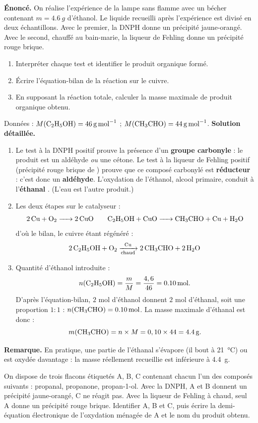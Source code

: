 \documentclass[11pt]{article}
\begin{document}
\begin{exoresolu}
\textbf{Énoncé.} On réalise l'expérience de la lampe sans flamme avec un bécher contenant $m = \SI{4,6}{g}$ d'éthanol. Le liquide recueilli après l'expérience est divisé en deux échantillons. Avec le premier, la DNPH donne un précipité jaune-orangé. Avec le second, chauffé au bain-marie, la liqueur de Fehling donne un précipité rouge brique.
\begin{enumerate}
\item Interpréter chaque test et identifier le produit organique formé.
\item Écrire l'équation-bilan de la réaction sur le cuivre.
\item En supposant la réaction totale, calculer la masse maximale de produit organique obtenu.
\end{enumerate}
Données : $M(\ce{C2H5OH}) = \SI{46}{g.mol^{-1}}$ ; $M(\ce{CH3CHO}) = \SI{44}{g.mol^{-1}}$.
\tcblower
\textbf{Solution détaillée.}
\begin{enumerate}
\item Le test à la DNPH positif prouve la présence d'un \textbf{groupe carbonyle}  : le produit est un aldéhyde \emph{ou} une cétone. Le test à la liqueur de Fehling positif (précipité rouge brique de ) prouve que ce composé carbonylé est \textbf{réducteur} : c'est donc un \textbf{aldéhyde}. L'oxydation de l'éthanol, alcool primaire, conduit à l'\textbf{éthanal} . (L'eau est l'autre produit.)
\item Les deux étapes sur le catalyseur :
\[ \ce{2 Cu + O2 -> 2 CuO} \qquad \ce{C2H5OH + CuO -> CH3CHO + Cu + H2O} \]
d'où le bilan, le cuivre étant régénéré :
\[ \ce{2 C2H5OH + O2 ->[Cu][chaud] 2 CH3CHO + 2 H2O} \]
\item Quantité d'éthanol introduite :
\[ n(\ce{C2H5OH}) = \frac{m}{M} = \frac{4,6}{46} = \SI{0,10}{mol}. \]
D'après l'équation-bilan, $2$ mol d'éthanol donnent $2$ mol d'éthanal, soit une proportion $1:1$ : $n(\ce{CH3CHO}) = \SI{0,10}{mol}$. La masse maximale d'éthanal est donc :
\[ m(\ce{CH3CHO}) = n \times M = 0,10 \times 44 = \SI{4,4}{g}. \]
\end{enumerate}
\textbf{Remarque.} En pratique, une partie de l'éthanal s'évapore (il bout à \SI{21}{\celsius}) ou est oxydée davantage : la masse réellement recueillie est inférieure à \SI{4,4}{g}.
\end{exoresolu}

\begin{exercice}
On dispose de trois flacons étiquetés A, B, C contenant chacun l'un des composés suivants : propanal, propanone, propan-1-ol. Avec la DNPH, A et B donnent un précipité jaune-orangé, C ne réagit pas. Avec la liqueur de Fehling à chaud, seul A donne un précipité rouge brique. Identifier A, B et C, puis écrire la demi-équation électronique de l'oxydation ménagée de A et le nom du produit obtenu.
\end{exercice}
\end{document}
